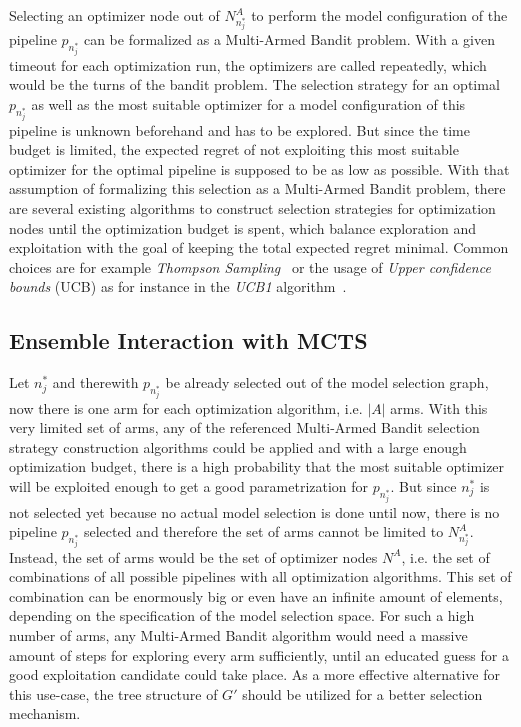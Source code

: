 Selecting an optimizer node out of $N^A_{n^*_j}$ to perform the model configuration of the pipeline $p_{n^*_j}$ can be formalized as a Multi-Armed Bandit problem.
With a given timeout for each optimization run, the optimizers are called repeatedly, which would be the turns of the bandit problem.
The selection strategy for an optimal $p_{n^*_j}$ as well as the most suitable optimizer for a model configuration of this pipeline is unknown beforehand and has to be explored.
But since the time budget is limited, the expected regret of not exploiting this most suitable optimizer for the optimal pipeline is supposed to be as low as possible.\newline
With that assumption of formalizing this selection as a Multi-Armed Bandit problem, there are several existing algorithms to construct selection strategies for optimization nodes until the optimization budget is spent, which balance exploration and exploitation with the goal of keeping the total expected regret minimal.
Common choices are for example \textit{Thompson Sampling}~\cite{Thompson-Sampling} or the usage of \textit{Upper confidence bounds} (UCB) as for instance in the \textit{UCB1} algorithm~\cite{Auer-UCB1}.

\subsection{Ensemble Interaction with MCTS}
\label{sec:approach:selection:mcts}
Let $n^*_j$ and therewith $p_{n^*_j}$ be already selected out of the model selection graph, now there is one arm for each optimization algorithm, i.e. $|A|$ arms.
With this very limited set of arms, any of the referenced Multi-Armed Bandit selection strategy construction algorithms could be applied and with a large enough optimization budget, there is a high probability that the most suitable optimizer will be exploited enough to get a good parametrization for $p_{n^*_j}$.\newline
But since $n^*_j$ is not selected yet because no actual model selection is done until now, there is no pipeline $p_{n^*_j}$ selected and therefore the set of arms cannot be limited to $N^A_{n^*_j}$.
Instead, the set of arms would be the set of optimizer nodes $N^A$, i.e. the set of combinations of all possible pipelines with all optimization algorithms.
This set of combination can be enormously big or even have an infinite amount of elements, depending on the specification of the model selection space.
For such a high number of arms, any Multi-Armed Bandit algorithm would need a massive amount of steps for exploring every arm sufficiently, until an educated guess for a good exploitation candidate could take place.
As a more effective alternative for this use-case, the tree structure of $G'$ should be utilized for a better selection mechanism.

